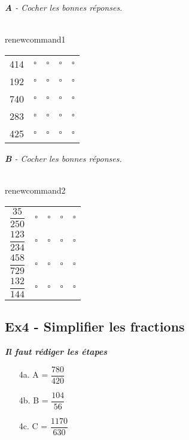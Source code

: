 \documentclass[12pt]{article}
\begin{document}
\textit{\textbf{A} - Cocher les bonnes réponses.}

\\renewcommand{\arraystretch}{1}

\begin{tabular}{c@{ est divisible : \kern1cm}l@{ par 2\kern1cm}l@{ par 3\kern1cm}l@{ par 5\kern1cm}l@{ par 10}}
  414 & $\square$ & $\square$ & $\square$ & $\square$ \\
  192 & $\square$ & $\square$ & $\square$ & $\square$ \\
  740 & $\square$ & $\square$ & $\square$ & $\square$ \\
  283 & $\square$ & $\square$ & $\square$ & $\square$ \\
  425 & $\square$ & $\square$ & $\square$ & $\square$ \\
\end{tabular}

\textit{\textbf{B} - Cocher les bonnes réponses.}

\\renewcommand{\arraystretch}{2}

\begin{tabular}{c@{ est divisible : \kern1cm}l@{ par 2\kern1cm}l@{ par 3\kern1cm}l@{ par 5\kern1cm}l@{ par 10}}
  $\dfrac{35}{250}$ & $\square$ & $\square$ & $\square$ & $\square$ \\
  $\dfrac{123}{234}$ & $\square$ & $\square$ & $\square$ & $\square$ \\
  $\dfrac{458}{729}$ & $\square$ & $\square$ & $\square$ & $\square$ \\
  $\dfrac{132}{144}$ & $\square$ & $\square$ & $\square$ & $\square$ \\
\end{tabular}


\subsection*{Ex4 - Simplifier les fractions}

\textit{\textbf{Il faut rédiger les étapes}}

\begin{multicols}{3}
  \begin{enumerate}
    \item[4a.] A = $\dfrac{780}{420}$
    \item[4b.] B = $\dfrac{104}{56}$
    \item[4c.] C = $\dfrac{1170}{630}$
  \end{enumerate} 
\end{multicols}
\end{document}

